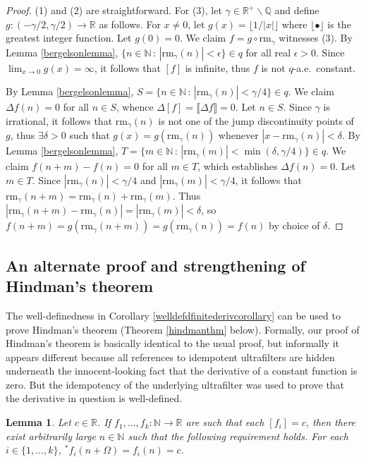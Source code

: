 \documentclass[microtype]{jloganal}
\newtheorem{lemma}[theorem]{Lemma}
\def\RM{\mathrm{rm}}
\begin{document}
\begin{proof}
    (1) and (2) are straightforward. For (3), let
    $\gamma\in\mathbb R^+\backslash \mathbb Q$ and
    define $g:(-\gamma/2,\gamma/2)\to\mathbb R$ as follows.
    For $x\not=0$,
    let $g(x)=\lfloor 1/|x|\rfloor$
    where $\lfloor \bullet\rfloor$ is the greatest integer function.
    Let $g(0)=0$.
    We claim $f=g\circ \RM_\gamma$ witnesses (3).
    By Lemma \ref{bergelsonlemma},
    $\{n\in\mathbb N\,:\,|\RM_\gamma(n)|<\epsilon\}\in q$
    for all real $\epsilon>0$. Since $\lim_{x\to 0}g(x)=\infty$,
    it follows that $[f]$ is infinite, thus $f$ is not
    $q$-a.e.\ constant.

    By Lemma \ref{bergelsonlemma},
    $S=\{n\in\mathbb N\,:\,|\RM_\gamma(n)|<\gamma/4\}\in q$.
    We claim $\Delta f(n)=0$ for all $n\in S$, whence
    $\Delta[f]=\llbracket \Delta f\rrbracket=0$.
    Let $n\in S$.
    Since $\gamma$ is irrational, it follows that $\RM_\gamma(n)$ is not
    one of the jump discontinuity points of $g$, thus
    $\exists \delta>0$ such that $g(x)=g(\RM_\gamma(n))$
    whenever $|x-\RM_\gamma(n)|<\delta$.
    By Lemma \ref{bergelsonlemma},
    $T=\{m\in\mathbb N\,:\,|\RM_\gamma(m)|<\min(\delta,\gamma/4)\}\in q$.
    We claim $f(n+m)-f(n)=0$ for all $m\in T$,
    which establishes $\Delta f(n)=0$.
    Let $m\in T$.
    Since $|\RM_\gamma(n)|<\gamma/4$ and $|\RM_\gamma(m)|<\gamma/4$,
    it follows that $\RM_\gamma(n+m)=\RM_\gamma(n)+\RM_\gamma(m)$.
    Thus $|\RM_\gamma(n+m)-\RM_\gamma(n)|=|\RM_\gamma(m)|<\delta$,
    so $f(n+m)=g(\RM_\gamma(n+m))=g(\RM_\gamma(n))=f(n)$ by
    choice of $\delta$.
\end{proof}

\subsection{An alternate proof and strengthening of Hindman's theorem}

The well-definedness in Corollary \ref{welldefdfinitederivcorollary}
can be used to prove
Hindman's theorem (Theorem \ref{hindmanthm} below).
Formally, our proof of Hindman's theorem is
basically identical to the usual proof, but informally it appears
different because all references to idempotent ultrafilters are hidden
underneath the innocent-looking fact that the derivative
of a constant function is zero. But the idempotency of the underlying
ultrafilter was used to prove that the derivative in question is well-defined.

\begin{lemma}
\label{hindmanlemma}
    Let $c\in\mathbb R$. If $f_1,\ldots,f_k:\mathbb N\to\mathbb R$
    are such that each $[f_i]=c$, then there exist arbitrarily large
    $n\in\mathbb N$ such that the following requirement holds.
    For each $i\in\{1,\ldots,k\}$, ${}^*f_i(n+\Omega)=f_i(n)=c$.
\end{lemma}
\end{document}
